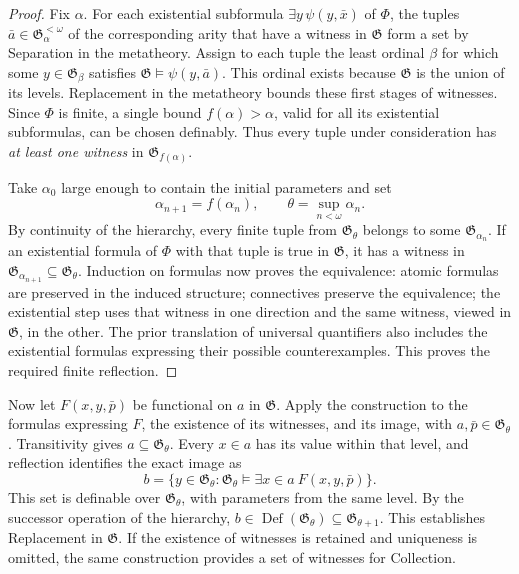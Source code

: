 \begin{proof}
Fix \(\alpha\). For each existential subformula
\(\exists y\,\psi(y,\bar x)\) of \(\Phi\), the tuples
\(\bar a\in\mathfrak G_\alpha^{<\omega}\) of the corresponding arity
that have a witness in \(\mathfrak G\) form a set by Separation in the
metatheory. Assign to each tuple the least ordinal \(\beta\) for which
some \(y\in\mathfrak G_\beta\) satisfies
\(\mathfrak G\models\psi(y,\bar a)\). This ordinal exists because
\(\mathfrak G\) is the union of its levels. Replacement in the metatheory
bounds these first stages of witnesses. Since \(\Phi\) is finite, a
single bound \(f(\alpha)>\alpha\), valid for all its existential
subformulas, can be chosen definably. Thus every tuple under consideration
has \emph{at least one witness} in \(\mathfrak G_{f(\alpha)}\).

Take \(\alpha_0\) large enough to contain the initial parameters and set
\[
 \alpha_{n+1}=f(\alpha_n),\qquad
 \theta=\sup_{n<\omega}\alpha_n.
\]
By continuity of the hierarchy, every finite tuple from
\(\mathfrak G_\theta\) belongs to some \(\mathfrak G_{\alpha_n}\).
If an existential formula of \(\Phi\) with that tuple is true in
\(\mathfrak G\), it has a witness in
\(\mathfrak G_{\alpha_{n+1}}\subseteq\mathfrak G_\theta\).
Induction on formulas now proves the equivalence: atomic formulas are
preserved in the induced structure; connectives preserve the equivalence;
the existential step uses that witness in one direction and the same
witness, viewed in \(\mathfrak G\), in the other. The prior translation
of universal quantifiers also includes the existential formulas expressing
their possible counterexamples. This proves the required finite reflection.
\end{proof}

Now let \(F(x,y,\bar p)\) be functional on \(a\) in \(\mathfrak G\).
Apply the construction to the formulas expressing \(F\), the existence
of its witnesses, and its image, with \(a,\bar p\in\mathfrak G_\theta\).
Transitivity gives \(a\subseteq\mathfrak G_\theta\). Every
\(x\in a\) has its value within that level, and reflection identifies
the exact image as
\[
 b=\{y\in\mathfrak G_\theta:
       \mathfrak G_\theta\models
       \exists x\in a\ F(x,y,\bar p)\}.
\]
This set is definable over \(\mathfrak G_\theta\), with parameters from
the same level. By the successor operation of the hierarchy,
\(b\in\operatorname{Def}(\mathfrak G_\theta)
\subseteq\mathfrak G_{\theta+1}\). This establishes Replacement in
\(\mathfrak G\). If the existence of witnesses is retained and uniqueness
is omitted, the same construction provides a set of witnesses for Collection.

